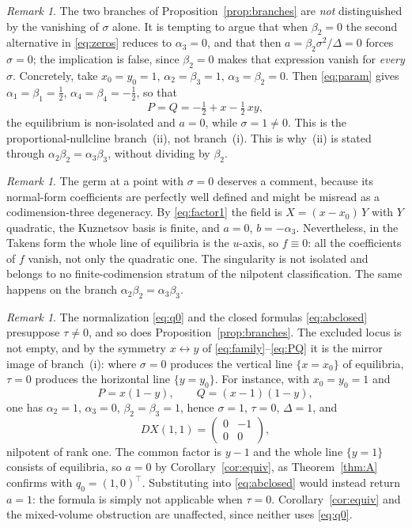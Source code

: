 \documentclass[12pt]{article}
\theoremstyle{plain}
\theoremstyle{definition}
\theoremstyle{remark}
\newtheorem{remark}[theorem]{Remark}
\begin{document}
	\begin{remark}\label{rem:beta2zero}
		The two branches of Proposition~\ref{prop:branches} are \emph{not}
		distinguished by the vanishing of $\sigma$ alone.  It is tempting to
		argue that when $\beta_{2}=0$ the second alternative in
		\eqref{eq:zeros} reduces to $\alpha_{3}=0$, and that then
		$a=\beta_{2}\sigma^{2}/\Delta=0$ forces $\sigma=0$; the implication is
		false, since $\beta_{2}=0$ makes that expression vanish for
		\emph{every} $\sigma$.  Concretely, take
		$x_{0}=y_{0}=1$, $\alpha_{2}=\beta_{3}=1$,
		$\alpha_{3}=\beta_{2}=0$.  Then \eqref{eq:param} gives
		$\alpha_{1}=\beta_{1}=\tfrac12$,
		$\alpha_{4}=\beta_{4}=-\tfrac12$, so that
		\[
		P=Q=-\tfrac12+x-\tfrac12\,xy ,
		\]
		the equilibrium is non-isolated and $a=0$, while
		$\sigma=1\neq0$.  This is the proportional-nullcline branch~(ii), not
		branch~(i).  This is why~(ii) is stated through
		$\alpha_{2}\beta_{2}=\alpha_{3}\beta_{3}$, without dividing by
		$\beta_{2}$.
	\end{remark}
	
	\begin{remark}\label{rem:whatisatsigma0}
		The germ at a point with $\sigma=0$ deserves a comment, because its
		normal-form coefficients are perfectly well defined and might be
		misread as a codimension-three degeneracy.  By \eqref{eq:factor1} the
		field is $X=(x-x_{0})\,Y$ with $Y$ quadratic, the Kuznetsov basis is
		finite, and $a=0$, $b=-\alpha_{3}$.  Nevertheless, in the Takens form
		the whole line of equilibria is the $u$-axis, so $f\equiv0$: all the
		coefficients of $f$ vanish, not only the quadratic one.  The
		singularity is not isolated and belongs to no finite-codimension
		stratum of the nilpotent classification.  The same happens on the
		branch $\alpha_{2}\beta_{2}=\alpha_{3}\beta_{3}$.
	\end{remark}
	
	\begin{remark}\label{rem:tauzero}
		The normalization \eqref{eq:q0} and the closed formulas
		\eqref{eq:abclosed} presuppose $\tau\neq0$, and so does
		Proposition~\ref{prop:branches}.  The excluded locus is not empty, and
		by the symmetry $x\leftrightarrow y$ of
		\eqref{eq:family}--\eqref{eq:PQ} it is the mirror image of
		branch~(i): where $\sigma=0$ produces the vertical line
		$\{x=x_{0}\}$ of equilibria, $\tau=0$ produces the horizontal line
		$\{y=y_{0}\}$.  For instance, with $x_{0}=y_{0}=1$ and
		\[
		P=x(1-y),\qquad Q=(x-1)(1-y),
		\]
		one has $\alpha_{2}=1$, $\alpha_{3}=0$, $\beta_{2}=\beta_{3}=1$,
		hence $\sigma=1$, $\tau=0$, $\Delta=1$, and
		\[
		DX(1,1)=\begin{pmatrix}0&-1\\ 0&0\end{pmatrix},
		\]
		nilpotent of rank one.  The common factor is $y-1$ and the whole line
		$\{y=1\}$ consists of equilibria, so $a=0$ by
		Corollary~\ref{cor:equiv}, as Theorem~\ref{thm:A} confirms with
		$q_{0}=(1,0)^{\top}$.  Substituting into \eqref{eq:abclosed} would
		instead return $a=1$: the formula is simply not applicable when
		$\tau=0$.  Corollary~\ref{cor:equiv} and the mixed-volume obstruction
		are unaffected, since neither uses \eqref{eq:q0}.
	\end{remark}
	
\end{document}
